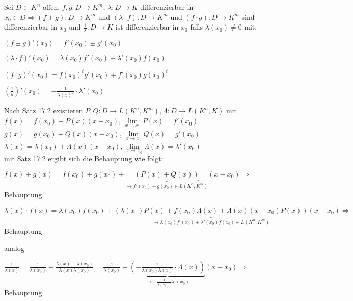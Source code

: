 	\begin{satz}[Rechenregeln]
		Sei $D\subset K^n$ offen, $f,g:D\to K^m$, $\lambda:D\to K$ differenzierbar in $x_0\in D
		\Rightarrow (f\pm g):D\to K^m$ und $(\lambda\cdot f):D\to K^m$ und $(f\cdot g):D\to K^m$ sind 
		differenzierbar in $x_0$ und $\frac{1}{\lambda}:D\to K$ ist differenzierbar in $x_0$ falls 
		$\lambda(x_0)\neq 0$ mit:
		\begin{compactitem}
			\item $(f\pm g)'(x_0)=f'(x_0)\pm g'(x_0)$
			\item $(\lambda\cdot f)'(x_0)=\lambda(x_0)f'(x_0)+\lambda'(x_0)f(x_0)$
			\item $(f\cdot g)'(x_0)=f(x_0)^tg'(x_0)+f'(x_0)g(x_0)^t$
			\item $\left( \frac{1}{y}\right)'(x_0)=-\frac{1}{\lambda(x)^2}\cdot\lambda'(x_0) $
		\end{compactitem}
	\end{satz}
	\begin{beweis}
		Nach Satz 17.2 existieren $P,Q:D\to L(K^n,K^m), \Lambda:D\to L(K^n,K)$ mit \\
		$f(x)=f(x_0)+P(x)(x-x_0)$, $\lim\limits_{x\to x_0} P(x)=f'(x_0)$ \\
		$g(x)=g(x_0)+Q(x)(x-x_0)$, $\lim\limits_{x\to x_0} Q(x)=g'(x_0)$ \\
		$\lambda(x)=\lambda(x_0)+\Lambda(x)(x-x_0)$, $\lim\limits_{x\to x_0} \Lambda(x)=\lambda'(x_0)$ \\
		mit Satz 17.2 ergibt sich die Behauptung wie folgt:
		\begin{compactitem}
			\item $f(x)\pm g(x)=f(x_0)\pm g(x_0)+\underbrace{(P(x)\pm Q(x))}_{\to f'(x_0)\pm g(x_0) \in 
			L(K^n,K^m)}(x-x_0)\Rightarrow$ Behauptung
			\item $\lambda(x)\cdot f(x)=\lambda(x_0)f(x_0)+\underbrace{\left(\lambda(x_0)P(x)+
			f(x_0)\Lambda(x)+\Lambda(x)(x-x_0)P(x) \right)}_{\to \lambda(x_0)f'(x_0)+\lambda'(x_0)
			f(x_0)\in L(K^n,K^m)}(x-x_0)\Rightarrow$ Behauptung
			\item analog
			\item $\frac{1}{\lambda(x)}=\frac{1}{\lambda(x_0)}-\frac{\lambda(x)-\lambda(x_0)}
			{\lambda(x)\lambda(x_0)}=\frac{1}{\lambda(x_0)}+\underbrace{\left( -\frac{1}
			{\lambda(x_0)\lambda(x)}\cdot\Lambda(x) \right)}_{\to -\frac{1}{\lambda(x_0)^2}\lambda'(x_0)}
			(x-x_0)\Rightarrow$ Behauptung
		\end{compactitem}
	\end{beweis}


